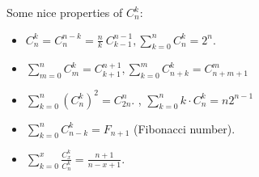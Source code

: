 Some nice properties of $C^k_n$:
\begin{itemize}
    \item $\displaystyle
    C^k_n = C^{n-k}_n = \frac{n}{k} \ C^{n-1}_{k-1}, \sum_{k = 0}^n C^k_n = 2^n.$

    \item $\displaystyle
    \sum_{m = 0}^n C^k_m = C^{n+1}_{k+1}, \sum_{k = 0}^m C^k_{n+k} = C^m_{n+m+1}$
    
    \item $\displaystyle
    \sum_{k = 0}^n (C^k_n)^2 = C^n_{2n}.$
    , $\displaystyle
    \sum_{k = 0}^n k \cdot C^k_n = n2^{n - 1}$

    \item $\displaystyle
    \sum_{k = 0}^n C^k_{n-k} = F_{n + 1}$ (Fibonacci number).
    \item $\displaystyle
    \sum_{k = 0}^{x} \frac{C^k_x}{C^k_n} = \frac{n + 1}{n - x + 1}.$
    
\end{itemize}
